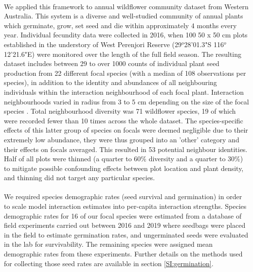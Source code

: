 \documentclass[a4,12pt]{article}
\begin{document}
        \paragraph{}
        We applied this framework to annual wildflower community dataset from Western Australia. This system is a diverse and well-studied community of annual plants which germinate, grow, set seed and die within approximately 4 months every year. Individual fecundity data were collected in 2016, when 100 50 x 50 cm plots established in the understory of West Perenjori Reserve (29$^o$28'01.3"S 116$^o$12'21.6"E) were monitored over the length of the full field season. The resulting dataset includes between 29 to over 1000 counts of individual plant seed production from 22 different focal species (with a median of 108 observations per species), in addition to the identity and abundances of all neighbouring individuals within the interaction neighbourhood of each focal plant. Interaction neighbourhoods varied in radius from 3 to 5 cm depending on the size of the focal species \parencite{Martyn2020}. Total neighbourhood diversity was 71 wildflower species, 19 of which were recorded fewer than 10 times across the whole dataset. The species-specific effects of this latter group of species on focals were deemed negligible due to their extremely low abundance, they were thus grouped into an 'other' category and their effects on focals averaged. This resulted in 53 potential neighbour identities. Half of all plots were thinned (a quarter to 60\% diversity and a quarter to 30\%) to mitigate possible confounding effects between plot location and plant density, and thinning did not target any particular species. 

        \paragraph{} 
        We required species demographic rates (seed survival and germination) in order to scale model interaction estimates into per-capita interaction strengths. Species demographic rates for 16 of our focal species were estimated from a database of field experiments carried out between 2016 and 2019 where seedbags were placed in the field to estimate germination rates, and ungerminated seeds were evaluated in the lab for survivability.  The remaining species were assigned mean demographic rates from these experiments. Further details on the methods used for collecting those seed rates are available in section \ref{SI:germination}.
\end{document}
